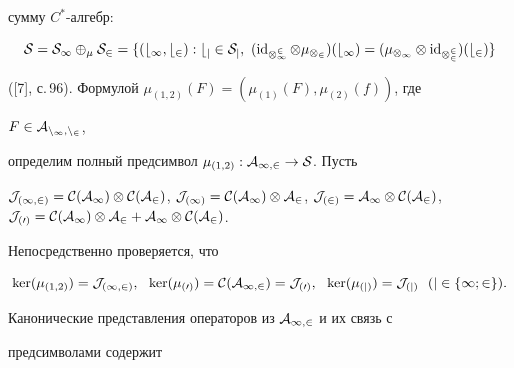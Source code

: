 сумму $C^*$-алгебр: 


$$ 


\cal S=\cal S_1\oplus_\mu\cal S_2=\{(b_1,b_2):b_j\in\cal S_j, 


\ (\id_{\Omega^2_1}\otimes\mu_{\Omega_2})(b_1)= 


(\mu_{\Omega_1}\otimes\id_{\Omega^2_2})(b_2)\} 


$$ 


([7], с.\,96). Формулой $\mu_{(1,2)}(F)=(\mu_{(1)}(F),\mu_{(2)}(f))$, где 


$F\in\cal A_{n_1,n_2}$, 


определим полный предсимвол $\mu_{(1,2)}:\cal A_{1,2}\to\cal S$. Пусть 


$\cal J_{(1,2)}=\cal C(\cal A_1)\otimes\cal C(\cal A_2)$, $\cal 


J_{(1)}=\cal C(\cal A_1)\otimes\cal A_2$, $\cal J_{(2)}=\cal 


A_1\otimes\cal C(\cal A_2)$, $\cal J_{(0)}=\cal C(\cal A_1)\otimes\cal 


A_2+\cal A_1\otimes\cal C(\cal A_2)$. 


Непосредственно проверяется, что 


$$ 


\ker(\mu_{(1,2)})=\cal J_{(1,2)},\ \ 


\ker(\mu_{(0)})=\cal C(\cal A_{1,2})=\cal J_{(0)},\ \ 


\ker(\mu_{(j)})=\cal J_{(j)}\ \ (j\in\{1;2\}). 


$$ 


 


Канонические представления операторов из $\cal A_{1,2}$ и их связь с 


предсимволами содержит 


 


